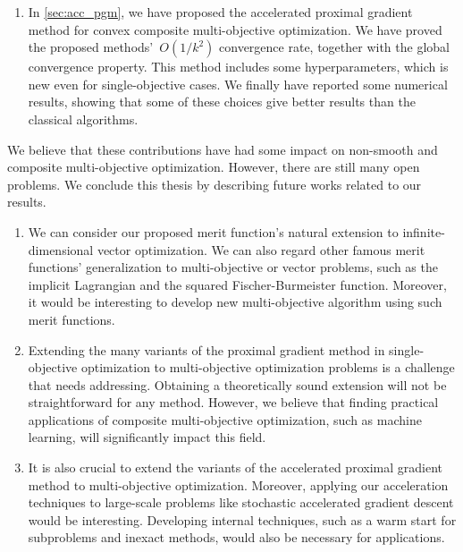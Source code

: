 \documentclass[../main]{subfiles}
\begin{document}
\begin{enumerate}
    \item In \cref{sec:acc_pgm}, we have proposed the accelerated proximal gradient method for convex composite multi-objective optimization.
        We have proved the proposed methods'~$O(1 / k^2)$ convergence rate, together with the global convergence property.
        This method includes some hyperparameters, which is new even for single-objective cases.
        We finally have reported some numerical results, showing that some of these choices give better results than the classical algorithms.
\end{enumerate}

We believe that these contributions have had some impact on non-smooth and composite multi-objective optimization.
However, there are still many open problems.
We conclude this thesis by describing future works related to our results.
\begin{enumerate}
    \item We can consider our proposed merit function's natural extension to infinite-dimensional vector optimization.
        We can also regard other famous merit functions' generalization to multi-objective or vector problems, such as the implicit Lagrangian and the squared Fischer-Burmeister function.
        Moreover, it would be interesting to develop new multi-objective algorithm using such merit functions.

    \item Extending the many variants of the proximal gradient method in single-objective optimization to multi-objective optimization problems is a challenge that needs addressing.
        Obtaining a theoretically sound extension will not be straightforward for any method.
        However, we believe that finding practical applications of composite multi-objective optimization, such as machine learning, will significantly impact this field.

    \item It is also crucial to extend the variants of the accelerated proximal gradient method to multi-objective optimization.
        Moreover, applying our acceleration techniques to large-scale problems like stochastic accelerated gradient descent would be interesting.
        Developing internal techniques, such as a warm start for subproblems and inexact methods, would also be necessary for applications.
\end{enumerate}
\end{document}
